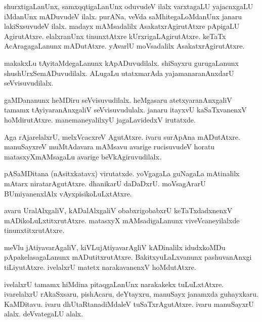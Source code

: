 \documentclass{article}
\begin{document}
\begin{mng}%
shurxtigaLanUnx, samxqqtigaLanUnx oduvudeV ilalx varxtagaLU yajacnxgaLU iMdanUnx mADuvudeV ilalx. 
purANa, veVda saMhitegaLoMdanUnx janaru lakiSxsuvudeV ilalx. madayx mAMsadalilx 
AsakatxrAgirutAtxre pApigaLU AgirutAtxre. elalxranUnx tinunxtAtxre kUrxrigaLAgirutAtxre. keTaTx 
AcAragagaLanunx mADutAtxre. yAvarlU moVsadalilx AsakatxrAgirutAtxre.
\end{mng}

\begin{mng}%
makakxLu tAyitaMdegaLanunx kApADuvudilalx. shiSayxru gurugaLanunx shushUrxSemADuvudilalx. ALugaLu 
utatxmarAda yajamanaranAnxdarU seVvisuvudilalx.
\end{mng}

\begin{mng}%
gaMDananunx heMDiru seVvisuvudilalx. heMgasaru atetxyaranAnxgaliV tamamx tAyiyaranAnxgaliV 
seVvisuvudulalx. janaru itayxvU kaSaTxvanenxV hoMdirutAtxre. manemaneyalilxyU jagaLavidedxV 
irutatxde.
\end{mng}

\begin{mng}%
Aga rAjarelalxrU, melxVcacxreV AgutAtxre. ivaru surApAna mADutAtxre. manuSayxreV muMtAdavara 
mAMsavu avarige rucisuvudeV horatu matasxyXmAMsagaLu avarige beVkAgiruvudilalx.
\end{mng}

\begin{mng}%
pASaMDitana (nAsitxkatavx) virutatxde. yoVgagaLa guNagaLa mAtinalilx mAtarx niratarAgutAtxre. 
dhanikarU daDaDxrU. moVsagArarU BUmiyanenxlAlx vAyxpisikoLuLxtAtxre.
\end{mng}

\begin{mng}%
avaru UralAlxgaliV, kADalAlxgaliV obabxrigobabxrU keTaTxdadxnenxV mADikoLuLxtitxrutAtxre. matasxyX 
mAMsadigaLanunx viveVcaneyilalxde tinunxtitxrutAtxre.
\end{mng}

\begin{mng}%
meVlu jAtiyavarAgaliV, kiVLujAtiyavarAgliV kADinalilx idudxkoMDu pApakelasagaLanunx 
mADutitxrutAtxre. BakitxyuLaLxvanunx pashuvanAnxgi tiLiyutAtxre. ivelalxrU matetx narakavanenxV 
hoMdutAtxre.
\end{mng}

\begin{mng}%
ivelalxrU tamamx hiMdina pitaqgaLanUnx narakakekx tuLuLxtAtxre. ivarelalxrU rAkaSxsaru, pishAcaru, 
deYtayxru, manuSayx janamxda guhayxkaru. KaMDitavu. ivaru dhUtaRtanadiMdaleV tuSaTxrAgutAtxre. 
ivaru manuSayxrU alalx. deVvategaLU alalx.
\end{mng}
\end{document}
